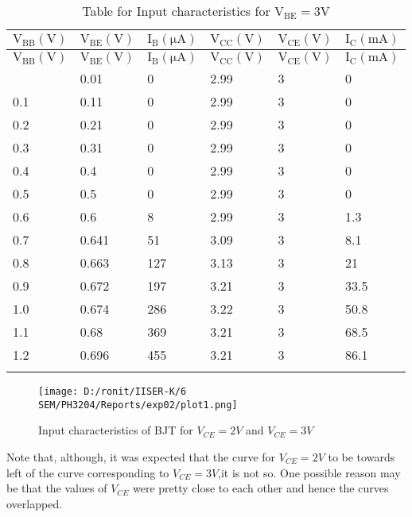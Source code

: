 \documentclass[12pt]{article}
\begin{document}
\begin{longtable}{|l|l|l|l|l|l|}
	\hline
    $\mathrm{V_{BB}(V)}$ & $\mathrm{V_{BE}(V)}$ & $\mathrm{I_{B}(\mu A)}$  & $\mathrm{V_{CC}(V)}$  & $\mathrm{V_{CE}(V)}$ & $\mathrm{I_{C}(m A)}$  \\ \hline
	\endfirsthead
	\hline
    $\mathrm{V_{BB}(V)}$ & $\mathrm{V_{BE}(V)}$ & $\mathrm{I_{B}(\mu A)}$  & $\mathrm{V_{CC}(V)}$  & $\mathrm{V_{CE}(V)}$ & $\mathrm{I_{C}(m A)}$  \\ \hline
	\endhead
	\hline
	\endfoot
	
	\endlastfoot
    0.01 & 0.01  & 0   & 2.99  & 3  & 0   \\ \hline
    0.1  & 0.11  & 0   & 2.99  & 3  & 0   \\ \hline
    0.2  & 0.21  & 0   & 2.99  & 3  & 0   \\ \hline
    0.3  & 0.31  & 0   & 2.99  & 3  & 0   \\ \hline
    0.4  & 0.4   & 0   & 2.99  & 3  & 0   \\ \hline
    0.5  & 0.5   & 0   & 2.99  & 3  & 0   \\ \hline
    0.6  & 0.6   & 8   & 2.99  & 3  & 1.3 \\ \hline
    0.7  & 0.641 & 51  & 3.09  & 3  & 8.1 \\ \hline
    0.8  & 0.663 & 127 & 3.13  & 3  & 21  \\ \hline
    0.9  & 0.672 & 197 & 3.21  & 3  & 33.5 \\ \hline
    1.0  & 0.674 & 286 & 3.22  & 3  & 50.8 \\ \hline
    1.1  & 0.68  & 369 & 3.21  & 3  & 68.5 \\ \hline
    1.2  & 0.696 & 455 & 3.21  & 3  & 86.1 \\ \hline
\caption{Table for Input characteristics for $\mathrm{V_{BE}=3V}$}
\label{tab:part01_02}
\end{longtable}\noindent
\begin{figure}[H]  
    \centering  
    \texttt{[image: D:/ronit/IISER-K/6 SEM/PH3204/Reports/exp02/plot1.png]}  %
    \caption{Input characteristics of BJT for $V_{CE}=2V$ and $V_{CE}=3V$}  %
    \label{fig:part01_01}  %
  \end{figure}\noindent
  Note that, although, it was expected that the curve for $V_{CE}=2V$ to be towards left of the curve corresponding to $V_{CE}=3V$,it is not so. One possible reason may be that the values of $V_{CE}$ were pretty close to each other and hence the curves overlapped.\\
\end{document}
